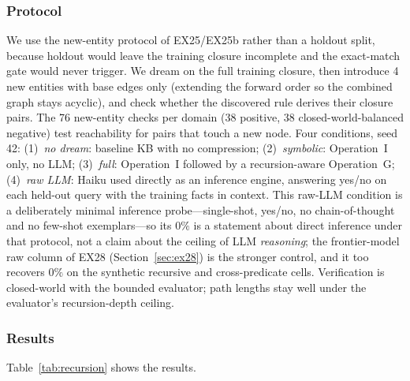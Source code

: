\documentclass[10pt,conference]{IEEEtran}
\begin{document}
\subsubsection{Protocol}
We use the new-entity protocol of EX25/EX25b rather than a holdout split, because holdout would leave the training closure incomplete and the exact-match gate would never trigger. We dream on the full training closure, then introduce 4 new entities with base edges only (extending the forward order so the combined graph stays acyclic), and check whether the discovered rule derives their closure pairs. The 76 new-entity checks per domain (38 positive, 38 closed-world-balanced negative) test reachability for pairs that touch a new node. Four conditions, seed 42: (1)~\textit{no dream}: baseline KB with no compression; (2)~\textit{symbolic}: Operation~I only, no LLM; (3)~\textit{full}: Operation~I followed by a recursion-aware Operation~G; (4)~\textit{raw LLM}: Haiku used directly as an inference engine, answering yes/no on each held-out query with the training facts in context. This raw-LLM condition is a deliberately minimal inference probe---single-shot, yes/no, no chain-of-thought and no few-shot exemplars---so its $0\%$ is a statement about direct inference under that protocol, not a claim about the ceiling of LLM \emph{reasoning}; the frontier-model raw column of EX28 (Section~\ref{sec:ex28}) is the stronger control, and it too recovers $0\%$ on the synthetic recursive and cross-predicate cells. Verification is closed-world with the bounded evaluator; path lengths stay well under the evaluator's recursion-depth ceiling.

\subsubsection{Results}

Table~\ref{tab:recursion} shows the results.
\end{document}
